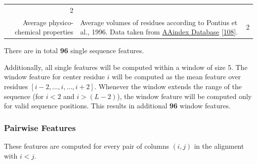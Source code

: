 \documentclass[12pt,a4paper,twoside]{book}
\theoremstyle{definition}
\theoremstyle{definition}
\theoremstyle{remark}
\begin{document}
\begin{longtable}[]{@{}rlc@{}}
\begin{minipage}[t]{0.18\columnwidth}
2\strut
\end{minipage}\tabularnewline
\begin{minipage}[t]{0.23\columnwidth}\raggedleft\strut
Average physico-chemical properties\strut
\end{minipage} & \begin{minipage}[t]{0.50\columnwidth}\raggedright\strut
Average volumes of residues according to Pontius et al., 1996. Data
taken from
\href{http://www.genome.jp/dbget-bin/www_bget?aaindex:PONJ960101}{AAindex
Database} {[}\protect\hyperlink{ref-Kawashima2008}{108}{]}.\strut
\end{minipage} & \begin{minipage}[t]{0.18\columnwidth}\centering\strut
2\strut
\end{minipage}\tabularnewline
\bottomrule
\end{longtable}

There are in total \textbf{96} single sequence features.

Additionally, all single features will be computed within a window of
size 5. The window feature for center residue \(i\) will be computed as
the mean feature over residues \([i-2, \ldots, i, \ldots, i+2]\).
Whenever the window extends the range of the sequence (for \(i\!<\!2\)
and \(i\!>\!(L-2)\)), the window feature will be computed only for valid
sequence positions. This results in additional \textbf{96} window
features.

\subsubsection{Pairwise Features}\label{seq-features-pairwise}

These features are computed for every pair of columns \((i, j)\) in the
alignment with \(i<j\).
\end{document}
